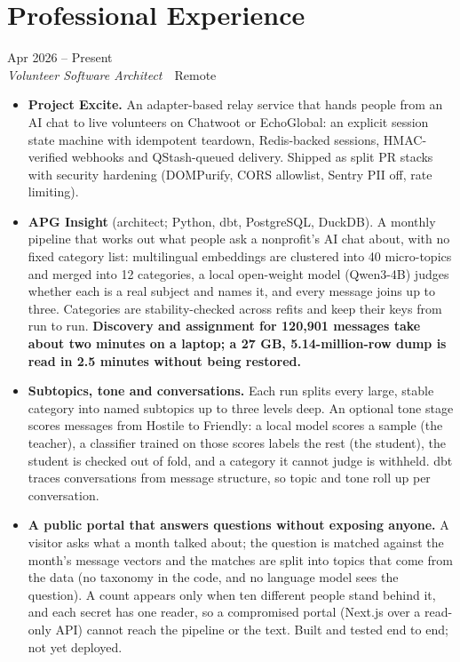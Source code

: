 \documentclass[10pt,letterpaper]{article}
\newcommand{\szmeta}{\fontsize{8pt}{10pt}\selectfont}
\begin{document}
\section*{Professional Experience}
\vspace{0pt}
 \hfill {\color{muted}\szmeta Apr 2026 – Present}\\[1pt]
{\itshape Volunteer Software Architect}{\color{muted}\ \textbullet\ Remote}
\vspace{2pt}
\begin{itemize}
\item \textbf{Project Excite.} An adapter-based relay service that hands people from an AI chat to live volunteers on Chatwoot or EchoGlobal: an explicit session state machine with idempotent teardown, Redis-backed sessions, HMAC-verified webhooks and QStash-queued delivery. Shipped as split PR stacks with security hardening (DOMPurify, CORS allowlist, Sentry PII off, rate limiting).
\item \textbf{APG Insight} {\color{muted}(architect; Python, dbt, PostgreSQL, DuckDB)}. A monthly pipeline that works out what people ask a nonprofit's AI chat about, with no fixed category list: multilingual embeddings are clustered into 40 micro-topics and merged into 12 categories, a local open-weight model (Qwen3-4B) judges whether each is a real subject and names it, and every message joins up to three. Categories are stability-checked across refits and keep their keys from run to run. \textbf{Discovery and assignment for 120,901 messages take about two minutes on a laptop; a 27 GB, 5.14-million-row dump is read in 2.5 minutes without being restored.}
\item \textbf{Subtopics, tone and conversations.} Each run splits every large, stable category into named subtopics up to three levels deep. An optional tone stage scores messages from Hostile to Friendly: a local model scores a sample (the teacher), a classifier trained on those scores labels the rest (the student), the student is checked out of fold, and a category it cannot judge is withheld. dbt traces conversations from message structure, so topic and tone roll up per conversation.
\item \textbf{A public portal that answers questions without exposing anyone.} A visitor asks what a month talked about; the question is matched against the month's message vectors and the matches are split into topics that come from the data (no taxonomy in the code, and no language model sees the question). A count appears only when ten different people stand behind it, and each secret has one reader, so a compromised portal (Next.js over a read-only API) cannot reach the pipeline or the text. Built and tested end to end; not yet deployed.
\end{itemize}
\end{document}
